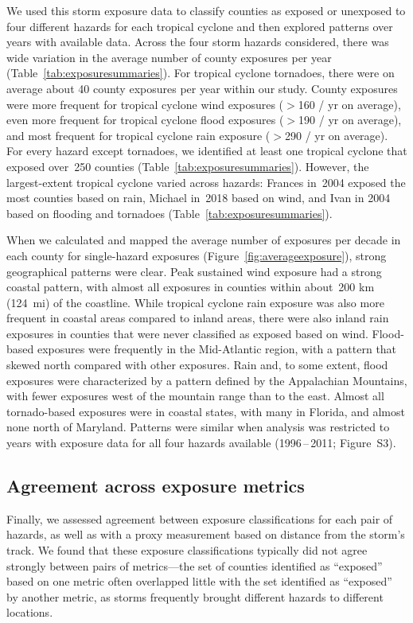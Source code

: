 We used this storm exposure data to classify counties as exposed or unexposed
to four different hazards for each tropical cyclone and then explored patterns
over years with available data. Across the four storm hazards considered, there
was wide variation in the average number of county exposures per year
(Table~\ref{tab:exposuresummaries}). For tropical cyclone tornadoes,
there were on average about 40 county exposures per year within our study.
County exposures were more frequent for tropical cyclone wind exposures ($>$160
/ yr on average), even more frequent for tropical cyclone flood exposures
($>$190 / yr on average), and most frequent for tropical cyclone rain exposure
($>$290 / yr on average). For every hazard except tornadoes, we identified at
least one tropical cyclone that exposed over~250 counties
(Table~\ref{tab:exposuresummaries}).  However, the largest-extent tropical
cyclone varied across hazards: Frances in~2004 exposed the most counties based
on rain, Michael in~2018 based on wind, and Ivan in 2004 based on flooding and
tornadoes (Table~\ref{tab:exposuresummaries}).

When we calculated and mapped the average number of exposures per decade in
each county for single-hazard exposures (Figure~\ref{fig:averageexposure}),
strong geographical patterns were clear. Peak sustained wind exposure had a
strong coastal pattern, with almost all exposures in counties within about~200
\si{\kilo\metre} (124~mi) of the coastline. While tropical cyclone rain
exposure was also more frequent in coastal areas compared to inland areas,
there were also inland rain exposures in counties that were never classified as
exposed based on wind. Flood-based exposures were frequently in the
Mid-Atlantic region, with a pattern that skewed north compared with other
exposures. Rain and, to some extent, flood exposures were characterized by a
pattern defined by the Appalachian Mountains, with fewer exposures west of the
mountain range than to the east. Almost all tornado-based exposures were in
coastal states, with many in Florida, and almost none north of Maryland.
Patterns were similar when analysis was restricted to years with exposure data
for all four hazards available (1996\,--\,2011; Figure~S3). 

\subsection*{Agreement across exposure metrics}

Finally, we assessed agreement between exposure classifications for each pair
of hazards, as well as with a proxy measurement based on
distance from the storm's track. We found that these exposure classifications
typically did not agree strongly between pairs of metrics---the set of counties
identified as ``exposed'' based on one metric often overlapped little with the set
identified as ``exposed'' by another metric, as storms frequently brought
different hazards to different locations. 

